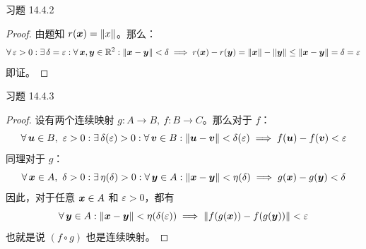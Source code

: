 \begin{problem}
    习题 14.4.2
    \begin{proof}
        由题知 $r(\boldsymbol{x}) = \norm{x}$。那么：
        $$
        \forall\,\varepsilon > 0: \exists\,\delta = \varepsilon: \forall\,\boldsymbol{x}, \boldsymbol{y} \in \mathbb{R}^2: \norm{\boldsymbol{x} - \boldsymbol{y}} < \delta \implies r(\boldsymbol{x}) - r(\boldsymbol{y}) = \norm{\boldsymbol{x}} - \norm{\boldsymbol{y}} \le \norm{\boldsymbol{x} - \boldsymbol{y}} = \delta = \varepsilon
        $$
        即证。
    \end{proof}
\end{problem}

\begin{problem}
    习题 14.4.3
    \begin{proof}
        设有两个连续映射 $g: A \to B,\ f: B \to C$。那么对于 $f$：
        $$
        \forall\, \boldsymbol{u} \in B,\ \varepsilon > 0: \exists\,\delta(\varepsilon) > 0: \forall\,\boldsymbol{v} \in B: \norm{\boldsymbol{u} - \boldsymbol{v}} < \delta(\varepsilon) \implies f(\boldsymbol{u}) - f(\boldsymbol{v}) < \varepsilon
        $$
        同理对于 $g$：
        $$
        \forall\, \boldsymbol{x} \in A,\ \delta > 0: \exists\,\eta(\delta) > 0: \forall\,\boldsymbol{y} \in A: \norm{\boldsymbol{x} - \boldsymbol{y}} < \eta(\delta) \implies g(\boldsymbol{x}) - g(\boldsymbol{y}) < \delta
        $$
        因此，对于任意 $\boldsymbol{x} \in A$ 和 $\varepsilon > 0$，都有
        $$
        \forall\, \boldsymbol{y} \in A: \norm{\boldsymbol{x} - \boldsymbol{y}} < \eta(\delta(\varepsilon)) \implies \norm{f(g(\boldsymbol{x})) - f(g(\boldsymbol{y}))} < \varepsilon
        $$
        也就是说 $(f \circ g)$ 也是连续映射。
    \end{proof}
\end{problem}